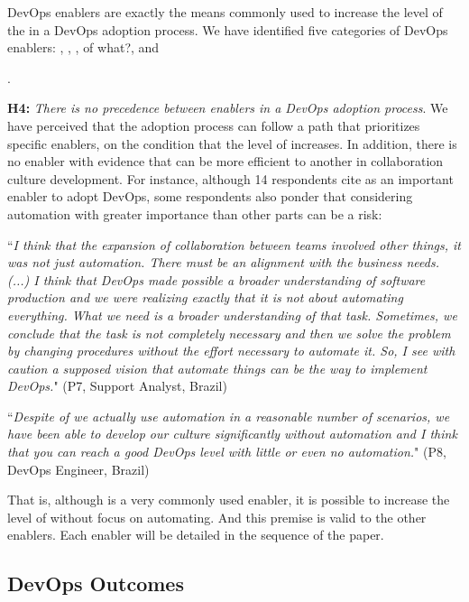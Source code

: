 DevOps enablers are exactly the means commonly used to increase the level of
the  in a DevOps adoption process.
We have identified five categories of DevOps enablers:
, , ,
 {\color{red}of what?}, and {.

\textbf{H4:} \textit{There is no precedence between enablers in a DevOps
adoption process}. We have perceived that the adoption process can follow a
path that prioritizes specific enablers, on the condition that the level of
 increases. In addition, there is no enabler with evidence that
can be more efficient to another in collaboration culture development. For
instance, although 14 respondents cite  as an important
enabler to adopt DevOps, some respondents also ponder that considering
automation with greater importance than other parts can be a risk:

\begin{mq}
``\emph{I think that the expansion of collaboration between teams involved other
things, it was not just automation. There must be an alignment with the
business needs. (...) I think that DevOps made possible a broader understanding
of software production and we were realizing exactly that it is not about
automating everything. What we need is a broader understanding of that task.
Sometimes, we conclude that the task is not completely necessary and then we
solve the problem by changing procedures without the effort necessary to
automate it. So, I see with caution a supposed vision that automate things can
be the way to implement DevOps.}" (P7, Support Analyst, Brazil)
\end{mq}

\begin{mq}
``\emph{Despite of we actually use automation in a reasonable number of scenarios, we have been able to develop our culture significantly without automation and I think that you can reach a good DevOps level with little or even no automation.}" (P8, DevOps Engineer, Brazil)
\end{mq}

That is, although  is a very commonly used enabler, it is possible to
increase the level of  without focus on automating. And
this premise is valid to the other enablers. {\color{red}Each enabler will be detailed in
the sequence of the paper}.

\subsection{DevOps Outcomes}

}
